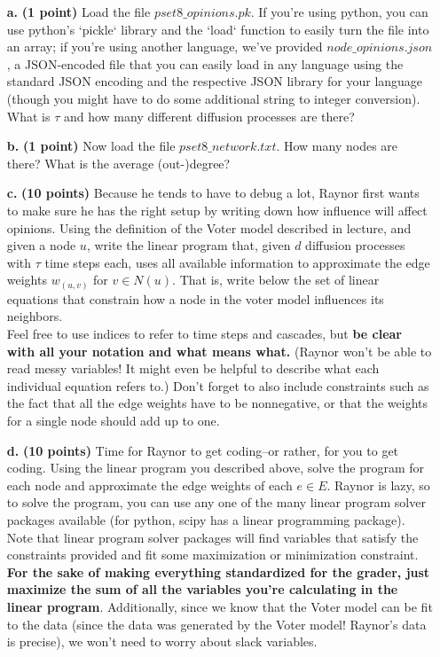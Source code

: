 \documentclass[11pt]{article}
\begin{document}
\begin{itemize}
\item[\textbf{a. }] \textbf{(1 point)} Load the file $pset8\_opinions.pk$. If you're using python, you can use python's `pickle` library and the `load` function to easily turn the file into an array; if you're using another language, we've provided $node\_opinions.json$, a JSON-encoded file that you can easily load in any language using the standard JSON encoding and the respective JSON library for your language (though you might have to do some additional string to integer conversion). What is $\tau$ and how many different diffusion processes are there? 
\item[\textbf{b. }] \textbf{(1 point)} Now load the file $pset8\_network.txt$. How many nodes are there? What is the average (out-)degree?
\item[\textbf{c. }] \textbf{(10 points)} Because he tends to have to debug a lot, Raynor first wants to make sure he has the right setup by writing down how influence will affect opinions. Using the definition of the Voter model described in lecture, and given a node $u$, write the linear program that, given $d$ diffusion processes with $\tau$ time steps each, uses all available information to approximate the edge weights $w_{(u,v)}$ for $v \in N(u)$. That is, write below the set of linear equations that constrain how a node in the voter model influences its neighbors.\\

Feel free to use indices to refer to time steps and cascades, but \textbf{be clear with all your notation and what means what.} (Raynor won't be able to read messy variables! It might even be helpful to describe what each individual equation refers to.) Don't forget to also include constraints such as the fact that all the edge weights have to be nonnegative, or that the weights for a single node should add up to one.

\item[\textbf{d. }] \textbf{(10 points)} Time for Raynor to get coding--or rather, for you to get coding. Using the linear program you described above, solve the program for each node and approximate the edge weights of each $e \in E$. Raynor is lazy, so to solve the program, you can use any one of the many linear program solver packages available (for python, scipy has a linear programming package).\\

Note that linear program solver packages will find variables that satisfy the constraints provided and fit some maximization or minimization constraint. \textbf{For the sake of making everything standardized for the grader, just maximize the sum of all the variables you're calculating in the linear program}. Additionally, since we know that the Voter model can be fit to the data (since the data was generated by the Voter model! Raynor's data is precise), we won't need to worry about slack variables. \\


\end{itemize}
\end{document}
